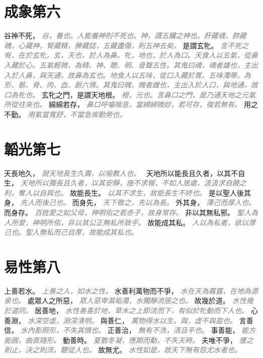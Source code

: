 \documentclass[a4paper,zihao=-4,oneside,landscape,UTF8]{ctexart}
\newcommand{\zhushi}[1]{\scriptsize{\textit{\textcolor{gray}{#1}}}\normalsize}
\begin{document}
\section{成象第六}

谷神不死，
\zhushi{谷，養也。人能養神則不死也。神，謂五臟之神也。肝藏魂，肺藏魄，心藏神，腎藏精，脾藏誌，五藏盡傷，則五神去矣。}
是謂玄牝。
\zhushi{言不死之有，在於玄牝。玄，天也，於人為鼻。牝，地也，於人為口。天食人以五氣，從鼻入藏於心。五氣輕微，為精、神、聰、明、音聲五性。其鬼曰魂，魂者雄也，主出入於人鼻，與天通，故鼻為玄也。地食人以五味，從口入藏於胃。五味濁辱，為形、骸、骨、肉、血、脈六情。其鬼曰魄，魄者雌也，主出入於人口，與地通，故口為牝也。}
玄牝之門，是謂天地根。
\zhushi{根，元也。言鼻口之門，是乃通天地之元氣所從往來也。}
綿綿若存，
\zhushi{鼻口呼噏喘息，當綿綿微妙，若可存，復若無有。}
用之不勤。
\zhushi{用氣當寬舒，不當急疾勤勞也。}


\section{韜光第七}

天長地久，
\zhushi{說天地長生久壽，以喻教人也。　}
天地所以能長且久者，以其不自生，
\zhushi{天地所以獨長且久者，以其安靜，施不求報，不如人居處，汲汲求自饒之利，奪人以自與也。}
故能長生。
\zhushi{以其不求生，故能長生不終也。}
是以聖人後其身，
\zhushi{先人而後己也。}
而身先，
\zhushi{天下敬之，先以為長。}
外其身，
\zhushi{薄己而厚人也。}
而身存。
\zhushi{百姓愛之如父母，神明佑之若赤子，故身常存。}
非以其無私邪。
\zhushi{聖人為人所愛，神明所佑，非以其公正無私所致乎。}
故能成其私。
\zhushi{人以為私者，欲以厚己也。聖人無私而己自厚，故能成其私也。}


\section{易性第八}

上善若水。
\zhushi{上善之人，如水之性。}
水善利萬物而不爭，
\zhushi{水在天為霧露，在地為源泉也。}
處眾人之所惡，
\zhushi{眾人惡卑濕垢濁，水獨靜流居之也。}
故幾於道。
\zhushi{水性幾於道同。}
居善地，
\zhushi{水性善喜於地，草木之上即流而下，有似於牝動而下人也。}
心善淵，
\zhushi{水深空虛，淵深清明。}
與善仁，
\zhushi{萬物得水以生。與，虛不與盈也。}
言善信，
\zhushi{水內影照形，不失其情也。}
正善治，
\zhushi{無有不洗，清且平也。}
事善能，
\zhushi{能方能圓，曲直隨形。}
動善時。
\zhushi{夏散冬凝，應期而動，不失天時。}
夫唯不爭，
\zhushi{壅之則止，決之則流，聽從人也。}
故無尤。
\zhushi{水性如是，故天下無有怨尤水者也。}
\end{document}
